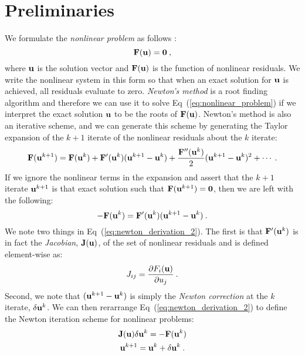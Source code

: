 \section{Preliminaries}
\label{sec:nonlinear_preliminaries}
We formulate the \textit{nonlinear problem} as follows
\citep{knoll_jacobian-free_2004}:
\begin{equation}
  \mathbf{F}(\mathbf{u}) = \mathbf{0}\:,
  \label{eq:nonlinear_problem}
\end{equation}
where $\mathbf{u}$ is the solution vector and $\mathbf{F}(\mathbf{u})$ is the
function of nonlinear residuals. We write the nonlinear system in this
form so that when an exact solution for $\mathbf{u}$ is achieved, all
residuals evaluate to zero. \textit{Newton's method} is a root finding
algorithm and therefore we can use it to solve
Eq~(\ref{eq:nonlinear_problem}) if we interpret the exact solution
$\mathbf{u}$ to be the roots of $\mathbf{F}(\mathbf{u})$. Newton's method is also
an iterative scheme, and we can generate this scheme by generating the
Taylor expansion of the $k+1$ iterate of the nonlinear residuals about
the $k$ iterate:
\begin{equation}
  \mathbf{F}(\mathbf{u}^{k+1}) = \mathbf{F}(\mathbf{u}^{k}) +
  \mathbf{F}'(\mathbf{u}^{k})(\mathbf{u}^{k+1}-\mathbf{u}^{k}) +
  \frac{\mathbf{F}''(\mathbf{u}^{k})}{2}(\mathbf{u}^{k+1}-\mathbf{u}^{k})^2 + \cdots
  \:.
  \label{eq:newton_derivation_1}
\end{equation}
If we ignore the nonlinear terms in the expansion and assert that the
$k+1$ iterate $\mathbf{u}^{k+1}$ is that exact solution such that
$\mathbf{F}(\mathbf{u}^{k+1}) = \mathbf{0}$, then we are left with the following:
\begin{equation}
  -\mathbf{F}(\mathbf{u}^{k}) =
  \mathbf{F}'(\mathbf{u}^{k})(\mathbf{u}^{k+1}-\mathbf{u}^{k})\:.
  \label{eq:newton_derivation_2}
\end{equation}
We note two things in Eq~(\ref{eq:newton_derivation_2}). The first is
that $\mathbf{F}'(\mathbf{u}^{k})$ is in fact the \textit{Jacobian},
$\mathbf{J}(\mathbf{u})$, of the set of nonlinear residuals and is defined
element-wise as:
\begin{equation}
  J_{ij} = \frac{\partial F_i(\mathbf{u})}{\partial u_j}\:.
  \label{eq:jacobian_def}
\end{equation}
Second, we note that $(\mathbf{u}^{k+1}-\mathbf{u}^{k})$ is simply the
\textit{Newton correction} at the $k$ iterate, $\delta \mathbf{u}^k$. We
can then rerarrange Eq~(\ref{eq:newton_derivation_2}) to define the
Newton iteration scheme for nonlinear problems:
\begin{subequations}
  \begin{gather}
    \mathbf{J}(\mathbf{u}) \delta \mathbf{u}^k = -\mathbf{F}(\mathbf{u}^{k})\\
    \mathbf{u}^{k+1} = \mathbf{u}^k + \delta \mathbf{u}^k\:.
  \end{gather}
  \label{eq:newton_iteration}
\end{subequations}
